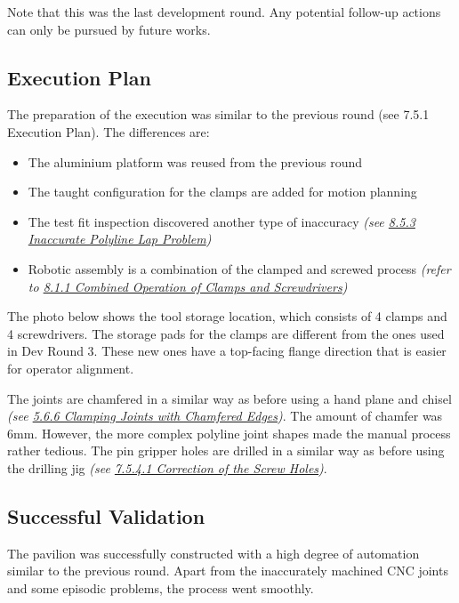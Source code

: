 Note that this was the last development round. Any potential follow-up actions can only be pursued by future works.

\subsection{Execution Plan}

The preparation of the execution was similar to the previous round (see 7.5.1 Execution Plan). The differences are:

\begin{itemize}
	\item The aluminium platform was reused from the previous round

	\item The taught configuration for the clamps are added for motion planning

	\item The test fit inspection discovered another type of inaccuracy \textit{(see \ul{8.5.3 Inaccurate Polyline Lap Problem})}

	\item Robotic assembly is a combination of the clamped and screwed process \textit{(refer to \ul{8.1.1 Combined Operation of Clamps and Screwdrivers})}

\end{itemize}
The photo below shows the tool storage location, which consists of 4 clamps and 4 screwdrivers. The storage pads for the clamps are different from the ones used in Dev Round 3. These new ones have a top-facing flange direction that is easier for operator alignment.




The joints are chamfered in a similar way as before using a hand plane and chisel \textit{(see \ul{5.6.6 Clamping Joints with Chamfered Edges})}. The amount of chamfer was 6mm. However, the more complex polyline joint shapes made the manual process rather tedious. The pin gripper holes are drilled in a similar way as before using the drilling jig \textit{(see \ul{7.5.4.1 Correction of the Screw Holes})}.




\subsection{Successful Validation}

The pavilion was successfully constructed with a high degree of automation similar to the previous round. Apart from the inaccurately machined CNC joints and some episodic problems, the process went smoothly. 

